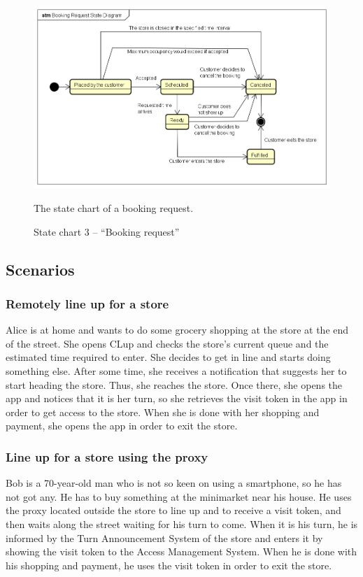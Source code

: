 \documentclass[a4paper,oneside,11pt]{book}   %
\newcommand{\captionrasd}[2]{\caption{#1}\par\begin{center}\vspace{-.01\textheight}\small#2.\end{center}}
\begin{document}
    \begin{figure}[H]
        \centering
        \includegraphics[width=.85\textwidth, keepaspectratio]{pictures/state_diagrams/booking_request}
        \captionrasd{State chart 3 -- ``Booking request''}{The state chart of a booking request}
        \label{figure:state_chart_3_booking_request}
    \end{figure}
    \subsection{Scenarios}
        \subsubsection{Remotely line up for a store}
        Alice is at home and wants to do some grocery shopping at the store at the end of the street. She opens CLup and checks the store’s current queue and the estimated time required to enter. She decides to get in line and starts doing something else. After some time, she receives a notification that suggests her to start heading the store. Thus, she reaches the store. Once there, she opens the app and notices that it is her turn,  so she retrieves the visit token in the app in order to get access to the store. When she is done with her shopping and payment, she opens the app in order to exit the store.
        \subsubsection{Line up for a store using the proxy}
        Bob is a 70-year-old man who is not so keen on using a smartphone, so he has not got any. He has to buy something at the minimarket near his house. He uses the proxy located outside the store to line up and to receive a visit token, and then waits along the street waiting for his turn to come. When it is his turn, he is informed by the Turn Announcement System of the store and enters it by showing the visit token to the Access Management System.  When he is done with his shopping and payment, he uses the visit token in order to exit the store.
\end{document}
